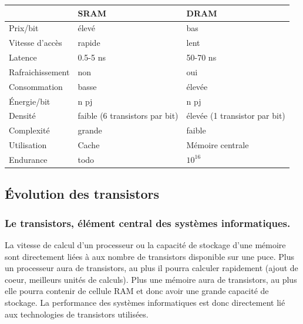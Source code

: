 \begin{table}[]
\begin{tabular}{l|l|l|}
\cline{2-3}
                                       & SRAM     & DRAM             \\ \hline
\multicolumn{1}{|l|}{Prix/bit}         & élevé    & bas              \\ \hline
\multicolumn{1}{|l|}{Vitesse d'accès}  & rapide   & lent             \\ \hline
\multicolumn{1}{|l|}{Latence}          & 0.5-5 ns & 50-70 ns        \\ \hline
\multicolumn{1}{|l|}{Rafraichissement} & non      & oui              \\ \hline
\multicolumn{1}{|l|}{Consommation}     & basse    & élevée           \\ \hline
\multicolumn{1}{|l|}{Énergie/bit}      & n pj     & n pj             \\ \hline
\multicolumn{1}{|l|}{Densité}          & faible (6 transistors par bit)   & élevée (1 transistor par bit)          \\ \hline
\multicolumn{1}{|l|}{Complexité}       & grande   & faible           \\ \hline
\multicolumn{1}{|l|}{Utilisation}      & Cache    & Mémoire centrale \\ \hline
\multicolumn{1}{|l|}{Endurance}        & todo     & $10^{16}$           \\ \hline
\end{tabular}
\end{table}




\subsection{Évolution des transistors}

\subsubsection{Le transistors, élément central des systèmes informatiques.}
La vitesse de calcul d'un processeur ou la capacité de stockage d'une mémoire sont directement liées à aux nombre de transistors disponible sur une puce. 
Plus un processeur aura de transistors, au plus il pourra calculer rapidement (ajout de coeur, meilleurs unités de calculs). Plus une mémoire aura de transistors, au plus elle pourra contenir de cellule RAM et donc avoir une grande capacité de stockage. La performance des systèmes informatiques est donc directement lié aux technologies de transistors utilisées. 


